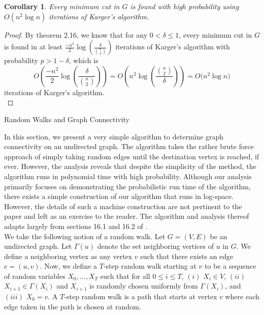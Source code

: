 \documentclass[psamsfonts, 10pt]{amsart}
\newtheorem{cor}[thm]{Corollary}
\theoremstyle{definition}
\theoremstyle{remark}
\numberwithin{equation}{section}
\begin{document}
\begin{cor}
Every minimum cut in $G$ is found with high probability using $O(n^2 \log n)$ iterations of Karger's algorithm.
\end{cor}
\begin{proof}
By theorem 2.16, we know that for any $0 < \delta \leq 1$, every minimum cut in $G$ is found in at least $\frac{-n^2}{2}\log\left(\frac{\delta}{\binom{n}{2}}\right)$ iterations of Karger's algorithm with probability $p > 1 - \delta$, which is
\[
O\left(\frac{-n^2}{2}\log\left(\frac{\delta}{\binom{n}{2}}\right)\right) = O\left(n^2\log\left(\frac{\binom{n}{2}}{\delta}\right)\right) = O\Big(n^2 \log n\Big)
\]
iterations of Karger's algorithm.
\\
\end{proof}






























\begin{section}{Random Walks and Graph Connectivity}
\end{section}
In this section, we present a very simple algorithm to determine graph connectivity on an undirected graph. The algorithm takes the rather brute force approach of simply taking random edges until the destination vertex is reached, if ever. However, the analysis reveals that despite the simplicity of the method, the algorithm runs in polynomial time with high probability. Although our analysis primarily focuses on demonstrating the probabilistic run time of the algorithm, there exists a simple construction of our algorithm that runs in log-space. However, the details of such a machine construction are not pertinent to the paper and left as an exercise to the reader. The algorithm and analysis thereof adapts largely from sections 16.1 and 16.2 of \cite{unreleasedtextbook}.\\

We take the following notion of a random walk. Let $G = (V,E)$ be an undirected graph. Let $\Gamma(u)$ denote the set neighboring vertices of $u$ in $G$. We define a neighboring vertex as any vertex $v$ such that there exists an edge $e = (u,v)$. Now, we define a $T$-step random walk starting at $v$ to be a sequence of random variables $X_0, ..., X_T$ such that for all $0 \leq i \leq T$, $(i)$ $X_i \in V$, $(ii)$ $X_{i+1} \in \Gamma(X_i)$ and $X_{i+1}$ is randomly chosen uniformly from $\Gamma(X_i)$, and $(iii)$ $X_0 = v$. A $T$-step random walk is a path that starts at vertex $v$ where each edge taken in the path is chosen at random.\\
\end{document}
